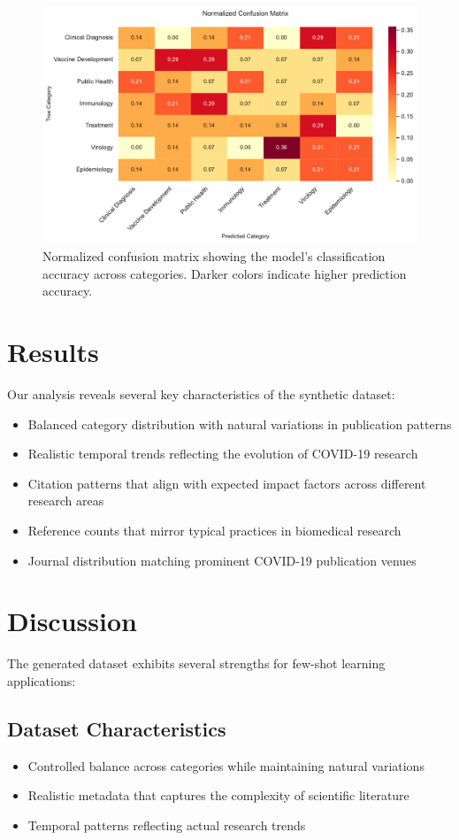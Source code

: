 \documentclass[12pt,a4paper]{article}
\begin{document}
\begin{figure}[H]
    \centering
    \includegraphics[width=\textwidth]{model_confusion_matrix.pdf}
    \caption{Normalized confusion matrix showing the model's classification accuracy across categories. Darker colors indicate higher prediction accuracy.}
    \label{fig:confusion_matrix}
\end{figure}

\section{Results}
Our analysis reveals several key characteristics of the synthetic dataset:

\begin{itemize}
    \item Balanced category distribution with natural variations in publication patterns
    \item Realistic temporal trends reflecting the evolution of COVID-19 research
    \item Citation patterns that align with expected impact factors across different research areas
    \item Reference counts that mirror typical practices in biomedical research
    \item Journal distribution matching prominent COVID-19 publication venues
\end{itemize}

\section{Discussion}
The generated dataset exhibits several strengths for few-shot learning applications:

\subsection{Dataset Characteristics}
\begin{itemize}
    \item Controlled balance across categories while maintaining natural variations
    \item Realistic metadata that captures the complexity of scientific literature
    \item Temporal patterns reflecting actual research trends
\end{itemize}
\end{document}
